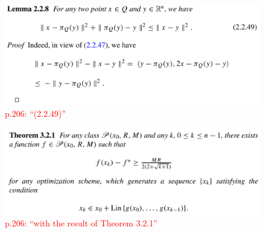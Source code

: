 \documentclass[a4paper, 14pt, dvipdfmx]{extarticle}
\newcommand{\red}[1]{\textcolor{red}{#1}}
\begin{document}
\begin{figure}[H]
    \centering
    \includegraphics[width=\columnwidth]{lem228.png}
    \caption{\red{p.206: ``(2.2.49)''}}
\end{figure}

\begin{figure}[H]
    \centering
    \includegraphics[width=\columnwidth]{thm321.png}
    \caption{\red{p.206: ``with the result of Theorem 3.2.1''}}
\end{figure}
\end{document}
